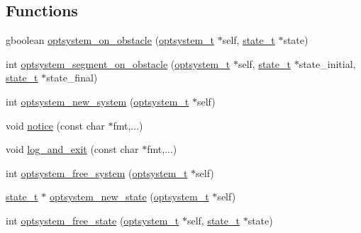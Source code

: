 \subsection*{\-Functions}
\begin{DoxyCompactItemize}
\item 
gboolean \hyperlink{a00017_a9f36fca086a6cf92613350b5b2d513a7_a9f36fca086a6cf92613350b5b2d513a7}{optsystem\-\_\-on\-\_\-obstacle} (\hyperlink{a00018_a48d08bbb4534f55ba817743a2b91360c_a48d08bbb4534f55ba817743a2b91360c}{optsystem\-\_\-t} $\ast$self, \hyperlink{a00018_a1c9d0bb39483d4981491e6383b0dbb47_a1c9d0bb39483d4981491e6383b0dbb47}{state\-\_\-t} $\ast$state)
\item 
int \hyperlink{a00017_a6d48ca08bb1eff5fab61ca3db90a7bb3_a6d48ca08bb1eff5fab61ca3db90a7bb3}{optsystem\-\_\-segment\-\_\-on\-\_\-obstacle} (\hyperlink{a00018_a48d08bbb4534f55ba817743a2b91360c_a48d08bbb4534f55ba817743a2b91360c}{optsystem\-\_\-t} $\ast$self, \hyperlink{a00018_a1c9d0bb39483d4981491e6383b0dbb47_a1c9d0bb39483d4981491e6383b0dbb47}{state\-\_\-t} $\ast$state\-\_\-initial, \hyperlink{a00018_a1c9d0bb39483d4981491e6383b0dbb47_a1c9d0bb39483d4981491e6383b0dbb47}{state\-\_\-t} $\ast$state\-\_\-final)
\item 
int \hyperlink{a00017_ad37a0c28a54088a6415ad9dd85542379_ad37a0c28a54088a6415ad9dd85542379}{optsystem\-\_\-new\-\_\-system} (\hyperlink{a00018_a48d08bbb4534f55ba817743a2b91360c_a48d08bbb4534f55ba817743a2b91360c}{optsystem\-\_\-t} $\ast$self)
\item 
void \hyperlink{a00017_aa9b138e04bbc249582d169d3e3b710df_aa9b138e04bbc249582d169d3e3b710df}{notice} (const char $\ast$fmt,...)
\item 
void \hyperlink{a00017_afc84c983cb791517c5f8cdf61cd6bea0_afc84c983cb791517c5f8cdf61cd6bea0}{log\-\_\-and\-\_\-exit} (const char $\ast$fmt,...)
\item 
int \hyperlink{a00017_a1b54dac5618bcfadd941a7585239e52e_a1b54dac5618bcfadd941a7585239e52e}{optsystem\-\_\-free\-\_\-system} (\hyperlink{a00018_a48d08bbb4534f55ba817743a2b91360c_a48d08bbb4534f55ba817743a2b91360c}{optsystem\-\_\-t} $\ast$self)
\item 
\hyperlink{a00018_a1c9d0bb39483d4981491e6383b0dbb47_a1c9d0bb39483d4981491e6383b0dbb47}{state\-\_\-t} $\ast$ \hyperlink{a00017_a7eb5bfb9a16cf6e49245635fa2400465_a7eb5bfb9a16cf6e49245635fa2400465}{optsystem\-\_\-new\-\_\-state} (\hyperlink{a00018_a48d08bbb4534f55ba817743a2b91360c_a48d08bbb4534f55ba817743a2b91360c}{optsystem\-\_\-t} $\ast$self)
\item 
int \hyperlink{a00017_a27f43c59aba7a8c383399066481b18ba_a27f43c59aba7a8c383399066481b18ba}{optsystem\-\_\-free\-\_\-state} (\hyperlink{a00018_a48d08bbb4534f55ba817743a2b91360c_a48d08bbb4534f55ba817743a2b91360c}{optsystem\-\_\-t} $\ast$self, \hyperlink{a00018_a1c9d0bb39483d4981491e6383b0dbb47_a1c9d0bb39483d4981491e6383b0dbb47}{state\-\_\-t} $\ast$state)

\end{DoxyCompactItemize}
